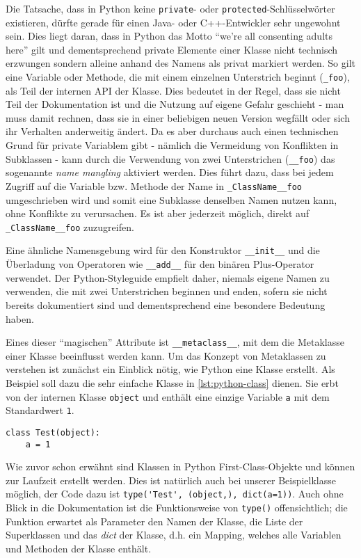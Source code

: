 Die Tatsache, dass in Python keine \lstinline{private}- oder \lstinline{protected}-Schlüsselwörter
existieren, dürfte gerade für einen Java- oder C++-Entwickler sehr ungewohnt sein. Dies liegt
daran, dass in Python das Motto \enquote{we're all consenting adults here} \citep{pymail:adults}
gilt und dementsprechend private Elemente einer Klasse nicht technisch erzwungen sondern alleine
anhand des Namens als privat markiert werden. So gilt eine Variable oder Methode, die mit einem
einzelnen Unterstrich beginnt (\lstinline{_foo}), als Teil der internen API der Klasse. Dies
bedeutet in der Regel, dass sie nicht Teil der Dokumentation ist und die Nutzung auf eigene Gefahr
geschieht - man muss damit rechnen, dass sie in einer beliebigen neuen Version wegfällt oder sich
ihr Verhalten anderweitig ändert. Da es aber durchaus auch einen technischen Grund für private
Variablem gibt - nämlich die Vermeidung von Konflikten in Subklassen - kann durch die Verwendung von
zwei Unterstrichen (\lstinline{__foo}) das sogenannte \emph{name mangling} aktiviert werden. Dies
führt dazu, dass bei jedem Zugriff auf die Variable bzw. Methode der Name in
\lstinline{_ClassName__foo} umgeschrieben wird und somit eine Subklasse denselben Namen nutzen kann,
ohne Konflikte zu verursachen. Es ist aber jederzeit möglich, direkt auf \lstinline{_ClassName__foo}
zuzugreifen.

Eine ähnliche Namensgebung wird für den Konstruktor \lstinline{__init__} und die Überladung von
Operatoren wie \lstinline{__add__} für den binären Plus-Operator verwendet. Der
Python-Styleguide empfielt daher, niemals eigene Namen zu verwenden, die mit zwei Unterstrichen
beginnen und enden, sofern sie nicht bereits dokumentiert sind und dementsprechend eine besondere
Bedeutung haben.

Eines dieser \enquote{magischen} Attribute ist \lstinline{__metaclass__}, mit dem die Metaklasse
einer Klasse beeinflusst werden kann. Um das Konzept von Metaklassen zu verstehen ist zunächst ein
Einblick nötig, wie Python eine Klasse erstellt. Als Beispiel soll dazu die sehr einfache Klasse in
\autoref{lst:python-class} dienen. Sie erbt von der internen Klasse \lstinline{object} und enthält
eine einzige Variable \lstinline{a} mit dem Standardwert \lstinline{1}.

\begin{lstlisting}[caption=Python-Klassendefinition,label=lst:python-class]
class Test(object):
    a = 1
\end{lstlisting}

Wie zuvor schon erwähnt sind Klassen in Python First-Class-Objekte und können zur Laufzeit erstellt
werden. Dies ist natürlich auch bei unserer Beispielklasse möglich, der Code dazu ist
\lstinline{type('Test', (object,), dict(a=1))}.
Auch ohne Blick in die Dokumentation ist die Funktionsweise von \lstinline{type()} offensichtlich;
die Funktion erwartet als Parameter den Namen der Klasse, die Liste der Superklassen und das
\emph{dict} der Klasse, d.h. ein Mapping, welches alle Variablen und Methoden der Klasse enthält.

